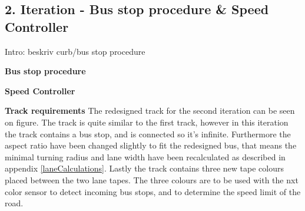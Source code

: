 




\subsection{2. Iteration - Bus stop procedure \& Speed Controller}
Intro: beskriv curb/bus stop procedure


\textbf{Bus stop procedure} \newline

\textbf{Speed Controller} \newline


\textbf{Track requirements} \newline
The redesigned track for the second iteration can be seen on figure. %
The track is quite similar to the first track, however in this iteration the track contains a bus stop, and is connected so it's infinite. Furthermore the aspect ratio have been changed slightly to fit the redesigned bus, that means the minimal turning radius and lane width have been recalculated as described in appendix \ref{laneCalculations}. Lastly the track contains three new tape colours placed between the two lane tapes. The three colours are to be used with the nxt color sensor to detect incoming bus stops, and to determine the speed limit of the road.

